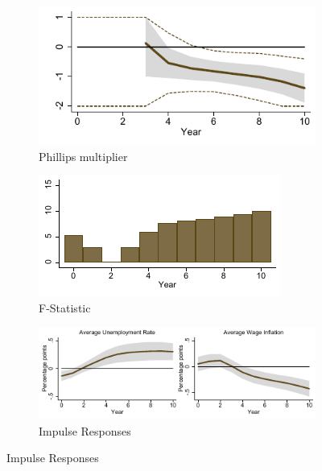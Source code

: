 \documentclass[12pt]{article}
\begin{document}
\begin{figure}[h!]
    \centering
	\caption{Phillips multiplier and IRFs}
	\label{F:Multiplie}
	\begin{subfigure}[b]{0.45\textwidth}
		\caption{Phillips multiplier}
		\label{F:Multiplier_M}
		\includegraphics[width=\textwidth]{../Output/Figures/Figure_3a.pdf}	
	\end{subfigure}
	\begin{subfigure}[b]{0.45\textwidth}
		\caption{F-Statistic}
		\label{F:Multiplier_F}
		\includegraphics[width=\textwidth]{../Output/Figures/Figure_3b.pdf}
	\end{subfigure}
	\begin{subfigure}[b]{0.9\textwidth}
		\caption{Impulse Responses}
		\label{F:Dynamics}
		\includegraphics[width=\textwidth]{../Output/Figures/Figure_3c.pdf}

\end{subfigure}
\end{figure}
\end{document}
